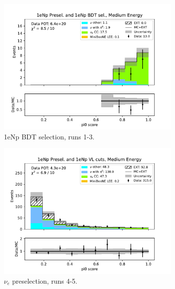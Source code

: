 \begin{figure}[H]
\begin{subfigure}{0.33\linewidth}
        \includegraphics[width=\linewidth]{technote/Sidebands/Figures/NearSideband/near_sideband_pi0_score_run123_NP_NPBDT_MEDIUM_ENERGY.pdf}
        \caption{1eNp BDT selection, runs 1-3.}
    \end{subfigure}
    \begin{subfigure}{0.33\linewidth}
        \includegraphics[width=\linewidth]{technote/Sidebands/Figures/NearSideband/near_sideband_pi0_score_run4b4c4d5_NP_NP_MEDIUM_ENERGY.pdf}
        \caption{$\nu_e$ preselection, runs 4-5.}
    \end{subfigure}%
    \begin{subfigure}{0.33\linewidth}

\end{subfigure}
\end{figure}

